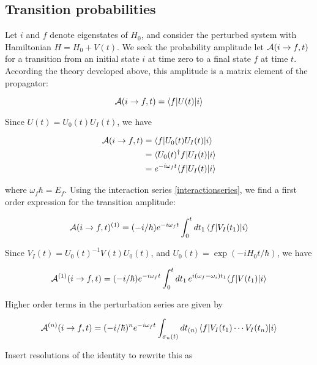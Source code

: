 \subsection{Transition probabilities}

Let $i$ and $f$ denote eigenstates of $H_0$, and consider the perturbed system with Hamiltonian $H = H_0 + V(t)$.  We seek the probability amplitude  let $\mathcal{A}(i \to f, t)$ for a transition from an initial state $i$ at time zero to a final state  $f$ at time $t$.  According the theory developed above, this amplitude is a matrix element of the propagator:

\begin{equation}
\mathcal{A}(i \to f, t) = \langle f | U(t) | i \rangle
\end{equation}

Since $U(t) = U_0(t)U_I(t)$, we have

\begin{align}
\mathcal{A}(i \to f, t) &= \langle f | U_0(t)U_I(t) | i \rangle \\
&= \langle U_0(t)^\dagger f | U_I(t) | i \rangle \\
&= e^{-i\omega_ft}\langle f | U_I(t) | i \rangle
\end{align}

where $\omega_f \hbar = E_f$.
Using the interaction series \eqref{interactionseries}, we find a first order expression for the transition amplitude:

\begin{equation}
\mathcal{A}(i \to f, t)^{(1)} = (-i/\hbar) e^{-i\omega_ft} \int_0^t dt_1\,  \langle f | V_I(t_1) | i \rangle 
\end{equation}

Since $V_I(t) = U_0(t)^{-1}V(t)U_0(t)$, and $U_0(t) = \exp(-iH_0t/\hbar)$, we have

\begin{equation}
\label{firstorderperturbationintegral}
\mathcal{A}^{(1)}(i \to f, t)= (-i/\hbar) e^{-i\omega_ft} \int_0^t dt_1\,  e^{i(\omega_f - \omega_i)t_1}\langle f |  V(t_1)  | i \rangle 
\end{equation}

Higher order terms in the perturbation series are given by

\begin{equation}
\mathcal{A}^{(n)}(i \to f, t )= (-i/\hbar)^n e^{-i\omega_ft} \int_{\sigma_n(t)} dt_{(n)}\,  \langle f | V_I(t_1) \cdots  V_I(t_n) | i \rangle 
\end{equation}

Insert resolutions of the identity to rewrite this as

